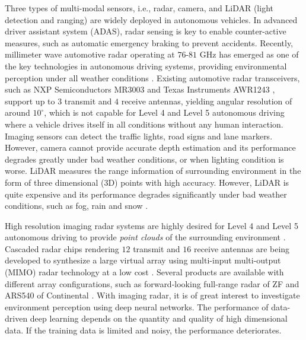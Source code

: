 \documentclass[conference]{IEEEtran}
\begin{document}
Three types of multi-modal sensors, i.e.,  radar, camera, and LiDAR (light detection and ranging) are widely deployed in autonomous vehicles. In advanced driver assistant system (ADAS), radar sensing is key to enable counter-active measures, such as automatic emergency braking to prevent accidents.
Recently, millimeter wave automotive radar operating at $76$-$81$ GHz has 
emerged as one of the  key technologies in autonomous driving systems, providing  environmental 
perception  under all weather conditions \cite{SUN_SPM_Feature_Article_2020}. Existing automotive radar transceivers, such as NXP Semiconductors MR3003 and Texas Instruments AWR1243 \cite{TI_AWR1243_Transceiver}, support up to $3$ transmit and $4$ receive antennas, yielding angular resolution of around $10^\circ$, which is not capable for Level 4 and Level 5 autonomous driving where a vehicle drives itself in all conditions without any human interaction.  Imaging sensors can detect the traffic lights, road signs and lane markers. However, camera cannot provide accurate depth estimation and its performance degrades greatly under bad weather conditions, or when lighting condition is worse. LiDAR measures the range information of surrounding environment in the form of three dimensional (3D) points with high accuracy. However, LiDAR is quite expensive and its performance degrades significantly under bad weather conditions, such as fog, rain and snow \cite{SUN_SPM_Feature_Article_2020}.

\vspace{-1mm}
High resolution imaging radar systems are highly desired for Level 4 and Level 5 autonomous driving to provide \emph{point clouds} of the surrounding environment  \cite{Bilik_RadarConf_2016,Meinl_ICMIM_2017,Alland_Patent_2018, SUN_SPM_Feature_Article_2020}. Cascaded radar chips rendering $12$ transmit and $16$ receive antennas are being developed \cite{ Bilik_Radarconf_2018,Uhner_PMCW_ISSCC_2019,TI_Cascade} to synthesize a large virtual array using multi-input multi-output (MIMO) radar technology at a low cost \cite{Jian_07,SUN_SPM_Feature_Article_2020}. Several products are available with different array configurations, such as forward-looking full-range radar of ZF and ARS540 of Continental \cite{ZF_Cascade,Continental_Cascade}.  With imaging radar, it is of great interest to investigate environment perception using deep neural networks. The performance of data-driven deep learning depends on the quantity and quality of high dimensional data. If the training data is limited and noisy, the performance deteriorates.
\end{document}

